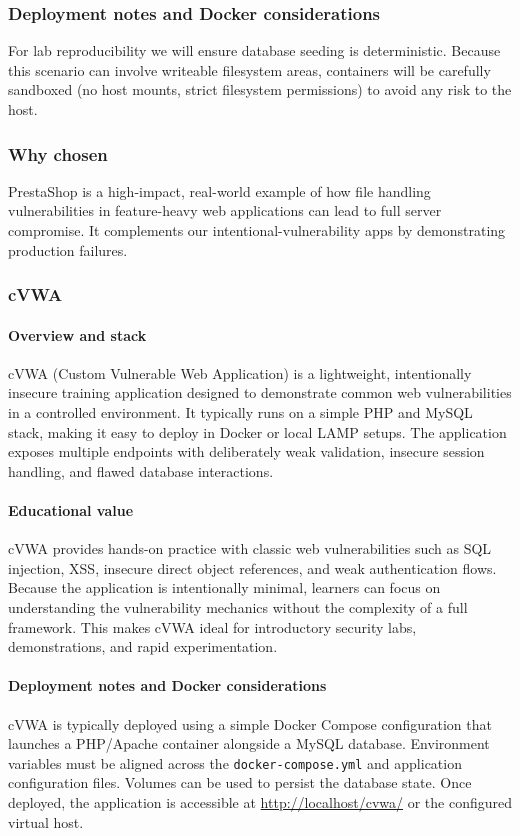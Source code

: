 \documentclass[12pt,titlepage]{article}
\begin{document}
\subsubsection*{Deployment notes and Docker considerations}
For lab reproducibility we will ensure database seeding is deterministic. Because this scenario can involve writeable filesystem areas, containers will be carefully sandboxed (no host mounts, strict filesystem permissions) to avoid any risk to the host.

\subsubsection*{Why chosen}
PrestaShop is a high-impact, real-world example of how file handling vulnerabilities in feature-heavy web applications can lead to full server compromise. It complements our intentional-vulnerability apps by demonstrating production failures.

\subsubsection{cVWA}

\paragraph{Overview and stack}
cVWA (Custom Vulnerable Web Application) is a lightweight, intentionally insecure training application designed to demonstrate common web vulnerabilities in a controlled environment. It typically runs on a simple PHP and MySQL stack, making it easy to deploy in Docker or local LAMP setups. The application exposes multiple endpoints with deliberately weak validation, insecure session handling, and flawed database interactions.

\paragraph{Educational value}
cVWA provides hands-on practice with classic web vulnerabilities such as SQL injection, XSS, insecure direct object references, and weak authentication flows. Because the application is intentionally minimal, learners can focus on understanding the vulnerability mechanics without the complexity of a full framework. This makes cVWA ideal for introductory security labs, demonstrations, and rapid experimentation.

\paragraph{Deployment notes and Docker considerations}
cVWA is typically deployed using a simple Docker Compose configuration that launches a PHP/Apache container alongside a MySQL database. Environment variables must be aligned across the \texttt{docker-compose.yml} and application configuration files. Volumes can be used to persist the database state. Once deployed, the application is accessible at \url{http://localhost/cvwa/} or the configured virtual host.
\end{document}
